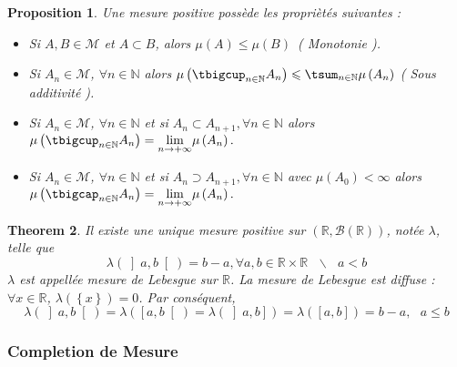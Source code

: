 \documentclass[3pt]{article}
\newtheorem{theorem}{Theorem}
\newtheorem{proposition}[theorem]{Proposition}
\begin{document}
\bigskip 

\begin{proposition}
Une mesure positive poss\`{e}de les propri\`{e}t\'{e}s suivantes :

\begin{itemize}
\item Si $A,B\in \mathcal{M}$ et $A\subset B$, alors $\mu (A)\leqslant \mu
\left( B\right) $\ ( Monotonie ).

\item Si $A_{n}\in \mathcal{M}$, $\forall n\in \mathbb{N}$ alors $\mu \left(
\tbigcup_{n\in \mathbb{N}}A_{n}\right) \leqslant \tsum_{n\in \mathbb{N}}\mu
\left( A_{n}\right) $ ( Sous additivit\'{e} ).

\item Si $A_{n}\in \mathcal{M}$, $\forall n\in \mathbb{N}$ et si $%
A_{n}\subset A_{n+1},\forall n\in \mathbb{N}$ alors $\mu \left(
\tbigcup_{n\in \mathbb{N}}A_{n}\right) =\underset{n\rightarrow +\infty }{%
\lim }\mu \left( A_{n}\right) .$

\item Si $A_{n}\in \mathcal{M}$, $\forall n\in \mathbb{N}$ et si $%
A_{n}\supset A_{n+1},\forall n\in \mathbb{N}$ avec $\mu \left( A_{0}\right)
<\infty $ alors $\mu \left( \tbigcap_{n\in \mathbb{N}}A_{n}\right) =\underset%
{n\rightarrow +\infty }{\lim }\mu \left( A_{n}\right) .$
\end{itemize}
\end{proposition}

\bigskip 

\begin{theorem}
Il existe une unique mesure positive sur $(\mathbb{R},\mathcal{B(\mathbb{R})}%
)$, not\'{e}e $\lambda $, telle que 
\begin{equation*}
\lambda (\left] a,b\right[ )=b-a,\forall a,b\in \mathbb{R}\times \mathbb{R}%
\text{ }\backslash \text{ }a<b
\end{equation*}%
$\lambda $ est appell\'{e}e mesure de Lebesgue sur $\mathbb{R}$. La mesure
de Lebesgue est diffuse : $\forall x\in \mathbb{R}$, $\lambda (\left\{
x\right\} )=0$. Par cons\'{e}quent,%
\begin{equation*}
\lambda (\left] a,b\right[ )=\lambda (\left[ a,b\right[ )=\lambda (\left] a,b%
\right] )=\lambda (\left[ a,b\right] )=b-a,\text{ }a\leq b
\end{equation*}
\end{theorem}

\subsubsection{Completion de Mesure}
\end{document}
